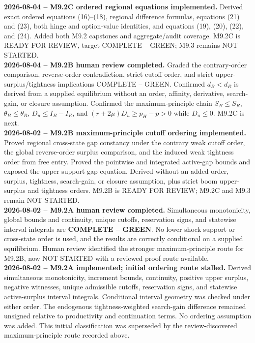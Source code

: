 \documentclass[10pt]{article}
\newcommand{\code}[1]{\texttt{\detokenize{#1}}}
\begin{document}
\textbf{2026-08-04 -- M9.2C ordered regional equations implemented.}
Derived exact ordered equations (16)--(18), regional difference formulas,
equations (21) and (23), both hinge and option-value identities, and equations
(19), (20), (22), and (24). Added both M9.2 capstones and aggregate/audit
coverage. M9.2C is READY FOR REVIEW, target COMPLETE -- GREEN; M9.3 remains
NOT STARTED.\\[0.45em]

\textbf{2026-08-04 -- M9.2B human review completed.}
Graded the contrary-order comparison, reverse-order contradiction, strict
cutoff order, and strict upper-surplus/tightness implications COMPLETE --
GREEN. Confirmed $d_B<d_R$ is derived from a supplied equilibrium without an
order, affinity, derivative, search-gain, or closure assumption. Confirmed the
maximum-principle chain $S_B\le S_R$, $\theta_B\le\theta_R$,
$D_u\le I_B-I_R$, and $(r+2\mu)D_u\ge p_H-p>0$ while $D_u\le0$. M9.2C is
next.\\[0.45em]

\textbf{2026-08-02 -- M9.2B maximum-principle cutoff ordering implemented.}
Proved regional cross-state gap constancy under the contrary weak cutoff order,
the global reverse-order surplus comparison, and the induced weak tightness
order from free entry. Proved the pointwise and integrated active-gap bounds
and exposed the upper-support gap equation. Derived
\code{boom_cutoff_lt_recession_cutoff} without an added order, surplus,
tightness, search-gain, or closure assumption, plus strict boom upper-surplus
and tightness orders. M9.2B is READY FOR REVIEW; M9.2C and M9.3 remain NOT
STARTED.\\[0.45em]

\textbf{2026-08-02 -- M9.2A human review completed.}
Simultaneous monotonicity, global bounds and continuity, unique cutoffs,
reservation signs, and statewise interval integrals are
\textbf{COMPLETE -- GREEN}. No lower shock support or cross-state order is
used, and the results are correctly conditional on a supplied equilibrium.
Human review identified the stronger maximum-principle route for M9.2B, now
NOT STARTED with a reviewed proof route available.\\[0.45em]

\textbf{2026-08-02 -- M9.2A implemented; initial ordering route stalled.}
Derived simultaneous monotonicity, increment bounds, continuity, positive
upper surplus, negative witnesses, unique admissible cutoffs, reservation
signs, and statewise active-surplus interval integrals. Conditional interval
geometry was checked under either order. The endogenous tightness-weighted
search-gain difference remained unsigned relative to productivity and
continuation terms. No ordering assumption was added. This initial
classification was superseded by the review-discovered maximum-principle
route recorded above.\\[0.45em]
\end{document}
